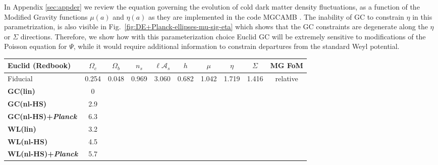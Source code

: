 In Appendix \ref{sec:appder} we review the equation governing the evolution of cold dark matter density fluctuations, 
as a function of the Modified Gravity functions $\mu(a)$ and $\eta(a)$ as they are implemented in the code MGCAMB \cite{hojjati_testing_2011}.
The inability of GC to constrain $\eta$ in this parametrization, is also visible in Fig.\ \ref{fig:DE+Planck-ellipses-mu-sig-eta} which shows that the GC constraints are
degenerate along the $\eta$ or $\Sigma$ directions.
Therefore, we show how with this parameterization choice Euclid GC will be extremely sensitive to
modifications of the Poisson equation for $\Psi$, while it would require additional
information to constrain departures from the standard Weyl potential.



\begin{table}[htbp]
\centering{}%
\tiny
\begin{tabular}{|l|c|c|c|c|c||c|c|c|c|}
\hline 
\textbf{Euclid} (Redbook) & $\Omega_{c}$  & $\Omega_{b}$  & $n_{s}$  &
$\ell\mathcal{A}_{s}$  & $h$  & $\mu$  & $\eta$  & $\Sigma$ & MG FoM
\Tstrut\tabularnewline
\hline 
\multicolumn{1}{|l|}{Fiducial}   & {0.254}  & {0.048}  & {0.969}  & { 3.060}  & {0.682 } & {1.042}  & {1.719}  & {1.416} & relative \Tstrut\tabularnewline
\hline
\hline
\Tstrut \textbf{GC(lin)
}  

& 0\tabularnewline
\Tstrut\textbf{GC(nl-HS) 
}  

& 2.9 \tabularnewline
\Tstrut\textbf{GC(nl-HS)+{\it Planck} 
}  

& 6.3 \tabularnewline
\hline 
\hline
\Tstrut \textbf{WL(lin) 
}  

& 3.2\tabularnewline
\Tstrut \textbf{WL(nl-HS) 
}    

& 4.5 \tabularnewline
\Tstrut \textbf{WL(nl-HS)+{\it Planck} 
}  

& 5.7 \tabularnewline
\hline

\end{tabular}
\end{table}
